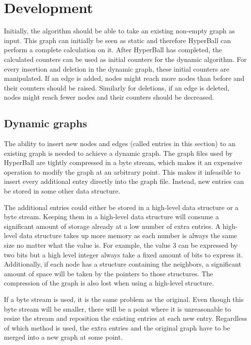 \chapter{Development}
Initially, the algorithm should be able to take an existing non-empty graph as input. This graph can initially be seen as static and therefore HyperBall can perform a complete calculation on it. After HyperBall has completed, the calculated counters can be used as initial counters for the dynamic algorithm. For every insertion and deletion in the dynamic graph, these initial counters are manipulated. If an edge is added, nodes might reach more nodes than before and their counters should be raised. Similarly for deletions, if an edge is deleted, nodes might reach fewer nodes and their counters should be decreased.

\section{Dynamic graphs}

The ability to insert new nodes and edges (called entries in this section) to an existing graph is needed to achieve a dynamic graph. The graph files used by HyperBall are tightly compressed in a byte stream, which makes it an expensive operation to modify the graph at an arbitrary point. This makes it infeasible to insert every additional entry directly into the graph file. Instead, new entries can be stored in some other data structure.

The additional entries could either be stored in a high-level data structure or a byte stream. Keeping them in a high-level data structure will consume a significant amount of storage already at a low number of extra entries. A high-level data structure takes up more memory as each number is always the same size no matter what the value is. For example, the value 3 can be expressed by two bits but a high level integer always take a fixed amount of bits to express it.  Additionally, if each node has a structure containing the neighbors, a significant amount of space will be taken by the pointers to those structures. The compression of the graph is also lost when using a high-level structure.

If a byte stream is used, it is the same problem as the original. Even though this byte stream will be smaller, there will be a point where it is unreasonable to resize the stream and reposition the existing entries at each new entry. Regardless of which method is used, the extra entries and the original graph have to be merged into a new graph at some point. 

